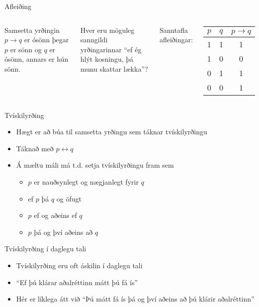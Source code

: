 \documentclass[handout]{beamer}
\begin{document}
\begin{frame}{Afleiðing}
\begin{columns}
Samsetta yrðingin $p \to q$ er ósönn þegar $p$ er sönn og $q$ er ósönn, annars er hún sönn.

\vspace*{0.5cm}

Hver eru möguleg sanngildi yrðingarinnar ``ef ég hlýt kosningu, þá munu skattar lækka''?

Sanntafla afleiðingar:
\begin{center}
\begin{tabular}{ccc}
\toprule
$p$&$q$&$p \to q$ \\
\midrule
1&1&1\\
1&0&0\\
0&1&1\\
0&0&1\\
\bottomrule
\end{tabular}
\end{center}
\end{columns}
\end{frame}

\begin{frame}{Tvískilyrðing}
\begin{itemize}
 \item Hægt er að búa til samsetta yrðingu sem táknar tvískilyrðingu
 \item Táknað með $p \leftrightarrow q$
 \item Á mæltu máli má t.d. setja tvískilyrðingu fram sem
 \begin{itemize}
  \item $p$ er nauðsynlegt og nægjanlegt fyrir $q$
  \item ef $p$ þá $q$ og öfugt
  \item $p$ ef og aðeins ef $q$
  \item $p$ þá og því aðeins að $q$
 \end{itemize}
\end{itemize}
\end{frame}

\begin{frame}{Tvískilyrðing í daglegu tali}
\begin{itemize}
 \item Tvískilyrðing eru oft áskilin í daglegu tali
 \item ``Ef þú klárar aðalréttinn mátt þú fá ís'' \pause
 \item Hér er líklega átt við ``Þú mátt fá ís þá og því aðeins að þú klárir aðalréttinn''
\end{itemize}
\end{frame}
\end{document}
